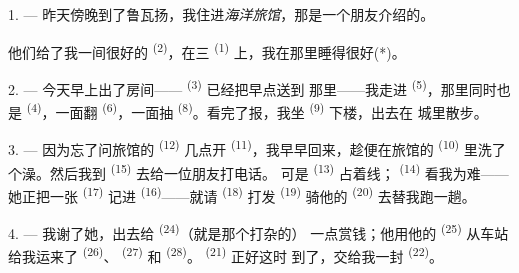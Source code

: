 %


\VUsaut{3.0mm}
\VUsaut{1.6mm}
\VUsaut{2.0mm}
\VUsaut{3.4mm}

1. --- 昨天傍晚到了鲁瓦扬，我住进\textit{海洋旅馆}，那是一个朋友介绍的。

他们给了我一间很好的 \textsuperscript{(2)}，在三
 \textsuperscript{(1)} 上，我在那里睡得很好(*)。

2. --- 今天早上出了房间—— \textsuperscript{(3)} 已经把早点送到
那里——我走进 \textsuperscript{(5)}，那里同时也是
\textsuperscript{(4)}，一面翻 \textsuperscript{(6)}，一面抽
\textsuperscript{(8)}。看完了报，我坐 \textsuperscript{(9)} 下楼，出去在
城里散步。

3. --- 因为忘了问旅馆的 \textsuperscript{(12)} 几点开
 \textsuperscript{(11)}，我早早回来，趁便在旅馆的 \textsuperscript{(10)}
里洗了个澡。然后我到 \textsuperscript{(15)} 去给一位朋友打电话。
可是 \textsuperscript{(13)} 占着线； \textsuperscript{(14)}
看我为难——她正把一张 \textsuperscript{(17)} 记进
\textsuperscript{(16)}——就请 \textsuperscript{(18)} 打发
\textsuperscript{(19)} 骑他的 \textsuperscript{(20)} 去替我跑一趟。

4. --- 我谢了她，出去给 \textsuperscript{(24)}（就是那个打杂的）
一点赏钱；他用他的 \textsuperscript{(25)} 从车站给我运来了
 \textsuperscript{(26)}、 \textsuperscript{(27)} 和
 \textsuperscript{(28)}。 \textsuperscript{(21)} 正好这时
到了，交给我一封 \textsuperscript{(22)}。

